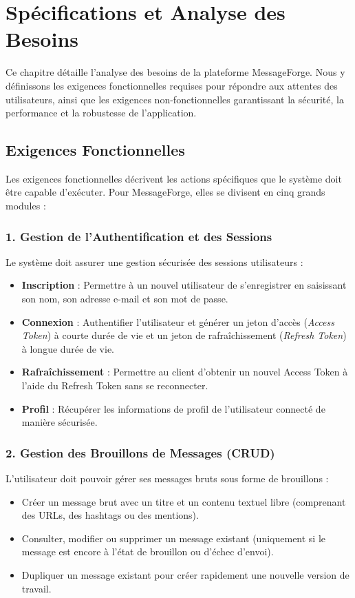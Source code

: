 \chapter{Spécifications et Analyse des Besoins}
\label{chapter:specifications}

Ce chapitre détaille l'analyse des besoins de la plateforme MessageForge. Nous y définissons les exigences fonctionnelles requises pour répondre aux attentes des utilisateurs, ainsi que les exigences non-fonctionnelles garantissant la sécurité, la performance et la robustesse de l'application.

\section{Exigences Fonctionnelles}

Les exigences fonctionnelles décrivent les actions spécifiques que le système doit être capable d'exécuter. Pour MessageForge, elles se divisent en cinq grands modules :

\subsection{1. Gestion de l'Authentification et des Sessions}
Le système doit assurer une gestion sécurisée des sessions utilisateurs :
\begin{itemize}
    \item \textbf{Inscription} : Permettre à un nouvel utilisateur de s'enregistrer en saisissant son nom, son adresse e-mail et son mot de passe.
    \item \textbf{Connexion} : Authentifier l'utilisateur et générer un jeton d'accès (\textit{Access Token}) à courte durée de vie et un jeton de rafraîchissement (\textit{Refresh Token}) à longue durée de vie.
    \item \textbf{Rafraîchissement} : Permettre au client d'obtenir un nouvel Access Token à l'aide du Refresh Token sans se reconnecter.
    \item \textbf{Profil} : Récupérer les informations de profil de l'utilisateur connecté de manière sécurisée.
\end{itemize}

\subsection{2. Gestion des Brouillons de Messages (CRUD)}
L'utilisateur doit pouvoir gérer ses messages bruts sous forme de brouillons :
\begin{itemize}
    \item Créer un message brut avec un titre et un contenu textuel libre (comprenant des URLs, des hashtags ou des mentions).
    \item Consulter, modifier ou supprimer un message existant (uniquement si le message est encore à l'état de brouillon ou d'échec d'envoi).
    \item Dupliquer un message existant pour créer rapidement une nouvelle version de travail.
\end{itemize}

